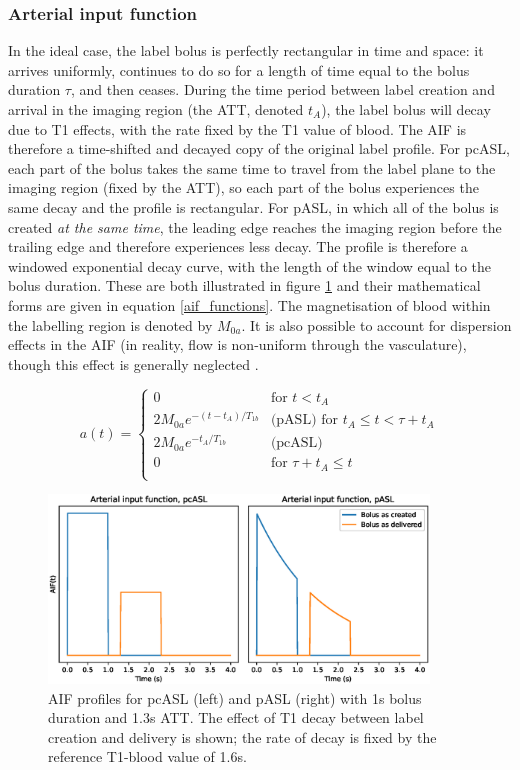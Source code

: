 \documentclass[12pt]{report}
\begin{document}
\subsubsection{Arterial input function}

In the ideal case, the label bolus is perfectly rectangular in time and space: it arrives uniformly, continues to do so for a length of time equal to the bolus duration $\tau$, and then ceases. During the time period between label creation and arrival in the imaging region (the ATT, denoted $t_A$), the label bolus will decay due to T1 effects, with the rate fixed by the T1 value of blood. The AIF is therefore a time-shifted and decayed copy of the original label profile. For pcASL, each part of the bolus takes the same time to travel from the label plane to the imaging region (fixed by the ATT), so each part of the bolus experiences the same decay and the profile is rectangular. For pASL, in which all of the bolus is created \textit{at the same time}, the leading edge reaches the imaging region before the trailing edge and therefore experiences less decay. The profile is therefore a windowed exponential decay curve, with the length of the window equal to the bolus duration. These are both illustrated in figure \ref{aif_profiles} and their mathematical forms are given in equation \ref{aif_functions}. The magnetisation of blood within the labelling region is denoted by $M_{0a}$. It is also possible to account for dispersion effects in the AIF (in reality, flow is non-uniform through the vasculature), though this effect is generally neglected \cite{asl_primer}. 

\begin{equation}
  a(t) =
  \begin{cases}
    0 & \text{for } t < t_{A} \\
    2M_{0a}e^{-(t-t_{A})/T_{1b}} & \text{(pASL) for } t_{A} \leq t < \tau + t_{A} \\
    2M_{0a}e^{-t_{A}/T_{1b}} & \text{(pcASL) } \\
    0 & \text{for } \tau + t_{A} \leq t \\
  \end{cases}
  \label{aif_functions}
\end{equation}


\begin{figure}[H]
\centering
\includegraphics[width = 0.9\textwidth]{aif_profiles.eps}
\caption{AIF profiles for pcASL (left) and pASL (right) with 1s bolus duration and 1.3s ATT. The effect of T1 decay between label creation and delivery is shown; the rate of decay is fixed by the reference T1-blood value of 1.6s.}
\label{aif_profiles}
\end{figure}
\end{document}

